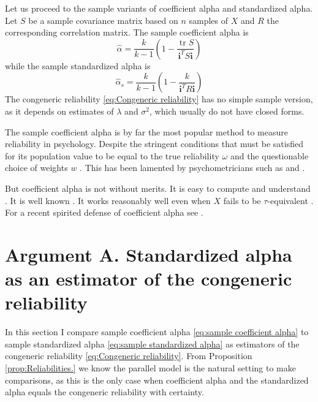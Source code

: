 \documentclass[twoside]{article}
\DeclareMathOperator{\tr}{tr}
\begin{document}
Let us proceed to the sample variants of coefficient alpha and standardized
alpha. Let $S$ be a sample covariance matrix based on
$n$ samples of $X$ and $R$ the corresponding correlation matrix.
The sample coefficient alpha is 
\begin{equation}
\hat{\alpha}=\frac{k}{k-1}\left(1-\frac{\tr{S}}{\mathbf{i}^{T}S\mathbf{i}}\right)\label{eq:sample coefficient alpha}
\end{equation}
while the sample standardized alpha is
\begin{equation}
\hat{\alpha}_s=\frac{k}{k-1}\left(1-\frac{k}{\mathbf{i}^{T}R\mathbf{i}}\right)\label{eq:sample standardized alpha}
\end{equation}
The congeneric reliability \eqref{eq:Congeneric reliability} has no
simple sample version, as it depends on estimates of $\lambda$ and
$\sigma^2$, which usually do not have closed forms.

The sample coefficient alpha is by far the most popular method to
measure reliability in psychology. Despite the stringent conditions
that must be satisfied for its population value to be equal to the
true reliability $\omega$ and the questionable choice of weights $w$ \citep{McNeish2019-ea}. This has been lamented by psychometricians such as \citet{McNeish2018-vu} and \citet{Sijtsma2009-hj}. 

But coefficient alpha is not without merits. It is easy to compute and understand \citep{Socan2000-aa}. It is well known \citep{Falk2011-ae}. It works reasonably well even when $X$ fails to be $\tau$-equivalent \citep{Raykov1997-bu}. For a recent spirited defense of coefficient alpha see \citep{Raykov2019-yr}.


\section{Argument A. Standardized alpha as an estimator of the congeneric reliability}
\label{sec:argument A}

In this section I compare sample coefficient alpha \eqref{eq:sample coefficient alpha} to sample standardized alpha \eqref{eq:sample standardized alpha} as estimators of the congeneric reliability \eqref{eq:Congeneric reliability}. From Proposition \ref{prop:Reliabilities.} we know the parallel model is the natural setting to make comparisons, as this is the only case when coefficient alpha and the standardized alpha equals the congeneric reliability with certainty.
\end{document}
